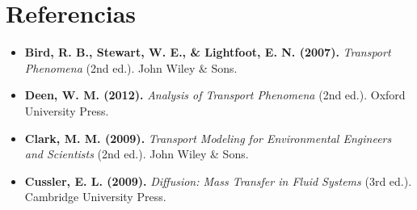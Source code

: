 \newpage
\section{Referencias}
\label{sec:references}

\begin{itemize}
    \item \textbf{Bird, R. B., Stewart, W. E., \& Lightfoot, E. N. (2007).} \emph{Transport Phenomena} (2nd ed.). John Wiley \& Sons.  
    \item \textbf{Deen, W. M. (2012).} \emph{Analysis of Transport Phenomena} (2nd ed.). Oxford University Press.  

    \item \textbf{Clark, M. M. (2009).} \emph{Transport Modeling for Environmental Engineers and Scientists} (2nd ed.). John Wiley \& Sons.  
    \item \textbf{Cussler, E. L. (2009).} \emph{Diffusion: Mass Transfer in Fluid Systems} (3rd ed.). Cambridge University Press.  


\end{itemize}
